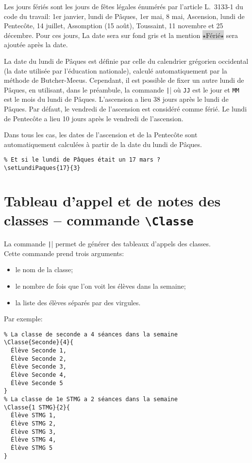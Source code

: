 \documentclass[a4paper,french,10pt]{article}
\begin{document}
Les jours fériés sont les jours de fêtes légales énumérés par l’article
L.~3133-1 du code du travail: 1er janvier, lundi de Pâques, 1er mai, 8 mai,
Ascension, lundi de Pentecôte, 14 juillet, Assomption (15 août), Toussaint, 11
novembre et 25 décembre. Pour ces jours, La date sera sur fond gris et la
mention \colorbox{lightgray}{$\star$Férié$\star$} sera ajoutée après la date.

La date du lundi de Pâques est définie par celle du calendrier grégorien
occidental (la date utilisée par l'éducation nationale), calculé automatiquement
par la méthode de Butcher-Meeus. Cependant, il est possible de fixer un autre
lundi de Pâques, en utilisant, dans le préambule, la commande
\texttt|| où \texttt{JJ} est le jour et
\texttt{MM} est le mois du lundi de Pâques. L'ascension a lieu 38 jours après le
lundi de Pâques. Par défaut, le vendredi de l'ascension est considéré comme
férié. Le lundi de Pentecôte a lieu 10 jours après le vendredi de l'ascension.

Dans tous les cas, les dates de l'ascension et de la Pentecôte sont
automatiquement calculées à partir de la date du lundi de Pâques.

\begin{verbatim}
% Et si le lundi de Pâques était un 17 mars ?
\setLundiPaques{17}{3}
\end{verbatim}

\section{Tableau d'appel et de notes des classes -- commande
\texttt{\textbackslash{}Classe}}

La commande \texttt|\Classe| permet de générer des tableaux
d'appels des classes.\\
Cette commande prend trois arguments:
\begin{itemize}
  \item le nom de la classe;
  \item le nombre de fois que l'on voit les élèves dans la semaine;
  \item la liste des élèves séparés par des virgules.
\end{itemize}
Par exemple:
\begin{verbatim}
% La classe de seconde a 4 séances dans la semaine 
\Classe{Seconde}{4}{
  Élève Seconde 1,
  Élève Seconde 2,
  Élève Seconde 3,
  Élève Seconde 4,
  Élève Seconde 5
}
% La classe de 1e STMG a 2 séances dans la semaine 
\Classe{1 STMG}{2}{
  Élève STMG 1,
  Élève STMG 2,
  Élève STMG 3,
  Élève STMG 4,
  Élève STMG 5
}
\end{verbatim}
\end{document}
